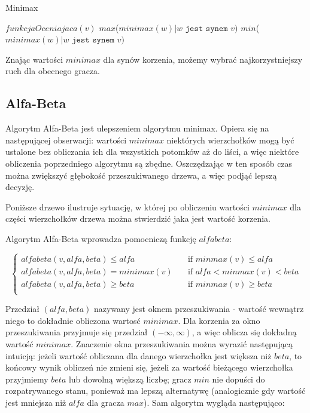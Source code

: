 \documentclass{pracamgr}
\begin{document}
\begin{algorithm}
\caption{Minimax}\label{minimax}
\begin{algorithmic}[1]
	\State \Return $funkcjaOceniajaca(v)$
\EndIf
{}
    \State \Return $max$($minimax(w) | \texttt{\(w\) jest synem \(v\)})$
\Else
    \State \Return $min$($minimax(w) | \texttt{\(w\) jest synem \(v\)})$
\EndIf
\EndFunction
\end{algorithmic}
\end{algorithm}

Znając wartości \(minimax\) dla synów korzenia, możemy wybrać najkorzystniejszy ruch dla obecnego gracza.

\subsection{Alfa-Beta}

Algorytm Alfa-Beta jest ulepszeniem algorytmu minimax. Opiera się na następującej obserwacji: wartości \(minimax\) niektórych wierzchołków mogą być ustalone bez obliczania ich dla wszystkich potomków aż do liści, a więc niektóre obliczenia poprzedniego algorytmu są zbędne. Oszczędzając w ten sposób czas można zwiększyć głębokość przeszukiwanego drzewa, a więc podjąć lepszą decyzję.

Poniższe drzewo ilustruje sytuację, w której po obliczeniu wartości \(minimax\) dla części wierzchołków drzewa można stwierdzić jaka jest wartość korzenia.

\begin{center}\end{center}

Algorytm Alfa-Beta wprowadza pomocniczą funkcję \(alfabeta\):

\[
  \begin{cases}
    alfabeta(v, alfa, beta) \leq alfa    & \quad \text{if } minmax(v) \leq alfa\\
    alfabeta(v, alfa, beta) = minimax(v) & \quad \text{if } alfa < minmax(v) < beta \\
    alfabeta(v, alfa, beta) \geq beta    & \quad \text{if } minmax(v) \geq beta \\
  \end{cases}
\]

Przedział \((alfa, beta)\) nazywany jest oknem przeszukiwania - wartość wewnątrz niego to dokładnie obliczona wartosć \(minimax\).
Dla korzenia za okno przeszukiwania przyjmuje się przedział \((-\infty, \infty)\), a więc oblicza się dokładną wartość \(minimax\).
Znaczenie okna przeszukiwania można wyrazić następującą intuicją: jeżeli wartość obliczana dla danego wierzchołka jest większa niż \(beta\), to końcowy wynik obliczeń nie zmieni się, jeżeli za wartość bieżącego wierzchołka przyjmiemy \(beta\) lub dowolną większą liczbę; gracz \(min\) nie dopuści do rozpatrywanego stanu, ponieważ ma lepszą alternatywę (analogicznie gdy wartość jest mniejsza niż \(alfa\) dla gracza \(max\)).
Sam algorytm wygląda następująco:
\end{document}
